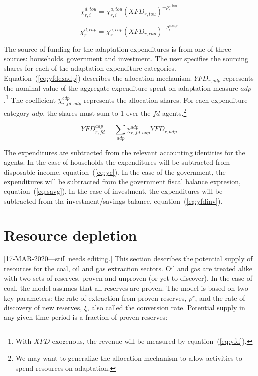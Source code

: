 \documentclass[11pt,letterpaper]{report}
\begin{document}
\begin{equation}
\label{eq:dam_shft_tou}
\chi^{d,\mathit{tou}}_{r,i}
= \chi^{a,\mathit{tou}}_{r,i} \left(
\mathit{XFD}_{r,\mathit{tou}}
\right)^{-\rho^{a,\mathit{tou}}_{r}}
\end{equation}

\begin{equation}
\label{eq:dam_shft_cap}
\chi^{d,\mathit{cap}}_{r}
= \chi^{a,\mathit{cap}}_{r} \left(
\mathit{XFD}_{r,\mathit{cap}}
\right)^{-\rho^{a,\mathit{cap}}_{r}}
\end{equation}

The source of funding for the adaptation expenditures
is from one of three sources: households, government and
investment. The user specifies the sourcing shares for
each of the adaptation expenditure categories.
Equation~(\ref{eq:yfdexadp}) describes the allocation mechanism.
$\mathit{YFD}_{r,\mathit{adp}}$ represents the nominal
value of the aggregate expenditure spent on adaptation
measure $\mathit{adp}$.\footnote{With
$\mathit{XFD}$ exogenous, the revenue will be measured
by equation~(\ref{eq:yfd}).} The coefficient
$\chi^{\mathit{adp}}_{r,\mathit{fd},\mathit{adp}}$ represents the allocation shares. For each
expenditure category $\mathit{adp}$, the shares must sum to 1
over the $\mathit{fd}$ agents.\footnote{We may want to generalize
the allocation mechanism to allow activities to
spend resources on adaptation.}

\begin{equation}
\label{eq:yfdexadp}
\mathit{YFD}^{\mathit{adp}}_{r,\mathit{fd}}
= \sum_{\mathit{adp}}{\chi^{\mathit{adp}}_{r,\mathit{fd},\mathit{adp}}
\mathit{YFD}_{r,\mathit{adp}}}
\end{equation}

\noindent The expenditures are subtracted from the relevant
accounting identities for the agents. In the case of households
the expenditures will be subtracted from disposable income,
equation~(\ref{eq:yc}). In the case of the government,
the expenditures will be subtracted from the government
fiscal balance expresion, equation~(\ref{eq:savg}). In the
case of investment, the expenditures will be subtracted from
the investment/savings balance, equation~(\ref{eq:yfdinv}).


\section{Resource depletion}

[17-MAR-2020---still needs editing.] This section describes the potential supply of resources
for the coal, oil and gas extraction sectors. Oil and
gas are treated alike with two sets of reserves, proven
and unproven (or yet-to-discover). In the case of coal, the
model assumes that all reserves are proven.
The model is based on two key parameters: the rate of extraction from proven reserves, $\rho^x$,
and the rate of discovery of new reserves, $\xi$, also called the conversion rate. Potential supply in any given time period is a fraction of proven reserves:
\end{document}
